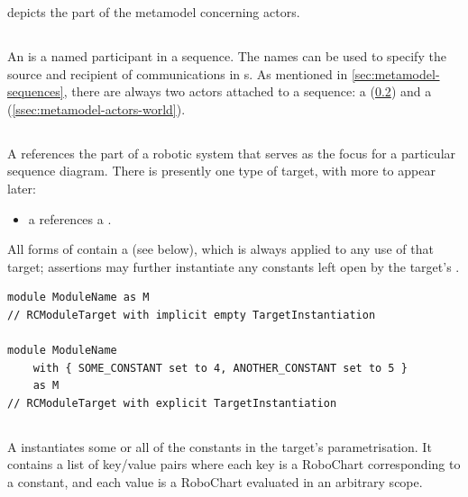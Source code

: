  depicts the part of the metamodel concerning
actors.

\subsection{\mactor}

An \mactor{} is a named participant in a sequence.  The names can be used to
specify the source and recipient of communications in \mmessagespec{}s.
As mentioned in
\cref{sec:metamodel-sequences}, there are always two actors
attached to a sequence: a \mtarget{} (\cref{ssec:metamodel-actors-target})
and a \mworld{} (\cref{ssec:metamodel-actors-world}).

\subsection{\mtarget}\label{ssec:metamodel-actors-target}

A \mtarget{} references the part of a robotic system that serves as the focus
for a particular sequence diagram.  There is
presently one type of target, with more to appear later:

\begin{itemize}
\item
	a \mrcmoduletarget{} references a \mrcmodule.
\end{itemize}

All forms of \mtarget{} contain a \mtargetinstantiation{} (see below), which
is always applied to any use of that target; assertions may further instantiate
any constants left open by the target's \mtargetinstantiation.

\begin{lstlisting}[style=Example]
module ModuleName as M
// RCModuleTarget with implicit empty TargetInstantiation

module ModuleName
    with { SOME_CONSTANT set to 4, ANOTHER_CONSTANT set to 5 }
    as M
// RCModuleTarget with explicit TargetInstantiation
\end{lstlisting}

\subsection{\mtargetinstantiation}

A \mtargetinstantiation{} instantiates some or all of the constants in the
target's parametrisation.  It contains a list of key/value pairs where each key
is a RoboChart \mvariable{} corresponding to a constant, and each value is a
RoboChart \mexpression{} evaluated in an arbitrary  scope.

